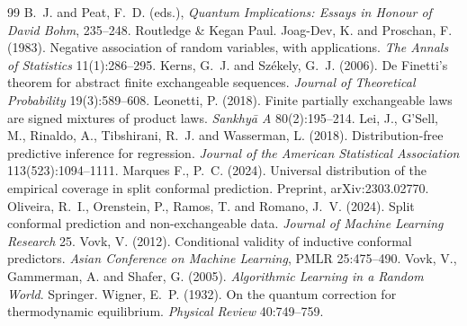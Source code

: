 \documentclass[11pt]{article}
\begin{document}
\begin{thebibliography}{99}
B.~J. and Peat, F.~D. (eds.), \emph{Quantum Implications: Essays in Honour of David Bohm},
235--248. Routledge \& Kegan Paul.
 Joag-Dev, K. and Proschan, F. (1983).
Negative association of random variables, with applications. \emph{The Annals of Statistics}
11(1):286--295.
 Kerns, G.~J. and Sz\'ekely, G.~J. (2006). De
Finetti's theorem for abstract finite exchangeable sequences. \emph{Journal of Theoretical
Probability} 19(3):589--608.
 Leonetti, P. (2018). Finite partially exchangeable laws
are signed mixtures of product laws. \emph{Sankhy\=a A} 80(2):195--214.
 Lei, J., G'Sell, M., Rinaldo, A., Tibshirani, R.~J. and
Wasserman, L. (2018). Distribution-free predictive inference for regression. \emph{Journal of
the American Statistical Association} 113(523):1094--1111.
 Marques F., P.~C. (2024). Universal distribution of the
empirical coverage in split conformal prediction. Preprint, arXiv:2303.02770.
 Oliveira, R.~I., Orenstein, P., Ramos, T. and
Romano, J.~V. (2024). Split conformal prediction and non-exchangeable data. \emph{Journal of
Machine Learning Research} 25.
 Vovk, V. (2012). Conditional validity of inductive conformal
predictors. \emph{Asian Conference on Machine Learning}, PMLR 25:475--490.
 Vovk, V., Gammerman, A. and Shafer, G. (2005).
\emph{Algorithmic Learning in a Random World}. Springer.
 Wigner, E.~P. (1932). On the quantum correction for
thermodynamic equilibrium. \emph{Physical Review} 40:749--759.
\end{thebibliography}
\end{document}
